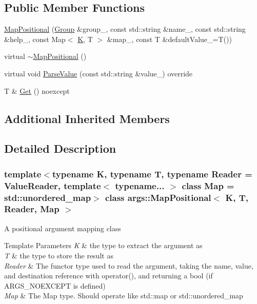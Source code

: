 \subsection*{Public Member Functions}
\begin{DoxyCompactItemize}
\item 
\hyperlink{classargs_1_1_map_positional_a5ffc44de32246532effe895152e066bc}{Map\+Positional} (\hyperlink{classargs_1_1_group}{Group} \&group\+\_\+, const std\+::string \&name\+\_\+, const std\+::string \&help\+\_\+, const Map$<$ \hyperlink{cgal__test_8cpp_a891e241aa245ae63618f03737efba309}{K}, T $>$ \&map\+\_\+, const T \&default\+Value\+\_\+=T())
\item 
virtual \hyperlink{classargs_1_1_map_positional_a6ac22277778b53bfec47cc6e244ef29c}{$\sim$\+Map\+Positional} ()
\item 
virtual void \hyperlink{classargs_1_1_map_positional_a8ac67b0ee5008bd6c9a39974c2a40ee4}{Parse\+Value} (const std\+::string \&value\+\_\+) override
\item 
T \& \hyperlink{classargs_1_1_map_positional_a46e4f230ddbca26b7eb849fd3d87510d}{Get} () noexcept
\end{DoxyCompactItemize}
\subsection*{Additional Inherited Members}


\subsection{Detailed Description}
\subsubsection*{template$<$typename K, typename T, typename Reader = Value\+Reader, template$<$ typename... $>$ class Map = std\+::unordered\+\_\+map$>$\newline
class args\+::\+Map\+Positional$<$ K, T, Reader, Map $>$}

A positional argument mapping class


\begin{DoxyTemplParams}{Template Parameters}
{\em K} & the type to extract the argument as \\
\hline
{\em T} & the type to store the result as \\
\hline
{\em Reader} & The functor type used to read the argument, taking the name, value, and destination reference with operator(), and returning a bool (if A\+R\+G\+S\+\_\+\+N\+O\+E\+X\+C\+E\+PT is defined) \\
\hline
{\em Map} & The Map type. Should operate like std\+::map or std\+::unordered\+\_\+map \\
\hline
\end{DoxyTemplParams}



